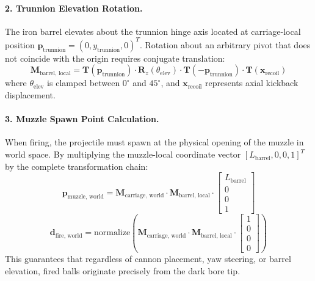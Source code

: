 \documentclass[11pt,a4paper]{article}
\begin{document}
\paragraph{2. Trunnion Elevation Rotation.}
The iron barrel elevates about the trunnion hinge axis located at carriage-local position $\mathbf{p}_{\text{trunnion}} = (0, y_{\text{trunnion}}, 0)^T$. Rotation about an arbitrary pivot that does not coincide with the origin requires conjugate translation:
\begin{equation}
  \mathbf{M}_{\text{barrel, local}} = \mathbf{T}(\mathbf{p}_{\text{trunnion}}) \cdot \mathbf{R}_z(\theta_{\text{elev}}) \cdot \mathbf{T}(-\mathbf{p}_{\text{trunnion}}) \cdot \mathbf{T}(\mathbf{x}_{\text{recoil}})
\end{equation}
where $\theta_{\text{elev}}$ is clamped between $0^\circ$ and $45^\circ$, and $\mathbf{x}_{\text{recoil}}$ represents axial kickback displacement.

\paragraph{3. Muzzle Spawn Point Calculation.}
When firing, the projectile must spawn at the physical opening of the muzzle in world space. By multiplying the muzzle-local coordinate vector $[L_{\text{barrel}}, 0, 0, 1]^T$ by the complete transformation chain:
\begin{equation}
  \mathbf{p}_{\text{muzzle, world}} = \mathbf{M}_{\text{carriage, world}} \cdot \mathbf{M}_{\text{barrel, local}} \cdot \begin{bmatrix} L_{\text{barrel}} \\ 0 \\ 0 \\ 1 \end{bmatrix}
\end{equation}
\begin{equation}
  \mathbf{d}_{\text{fire, world}} = \text{normalize}\left(\mathbf{M}_{\text{carriage, world}} \cdot \mathbf{M}_{\text{barrel, local}} \cdot \begin{bmatrix} 1 \\ 0 \\ 0 \\ 0 \end{bmatrix}\right)
\end{equation}
This guarantees that regardless of cannon placement, yaw steering, or barrel elevation, fired balls originate precisely from the dark bore tip.
\end{document}
